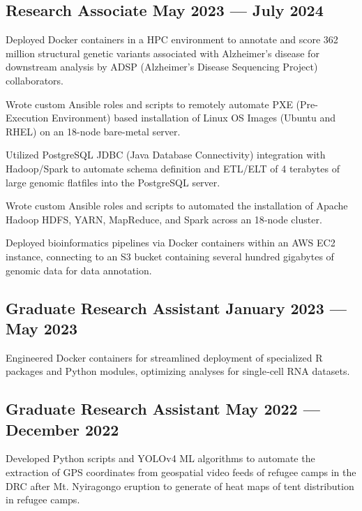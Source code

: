 \subsection{{Research Associate \hfill May 2023 --- July 2024}}
\begin{zitemize}
\item Deployed Docker containers in a HPC environment to annotate and score 362 million structural genetic variants associated with Alzheimer's disease for downstream analysis by ADSP (Alzheimer's Disease Sequencing Project) collaborators.
\item Wrote custom Ansible roles and scripts to remotely automate PXE (Pre-Execution Environment) based installation of Linux OS Images (Ubuntu and RHEL) on an 18-node bare-metal server.
\item  Utilized PostgreSQL JDBC (Java Database Connectivity) integration with Hadoop/Spark to automate schema definition and ETL/ELT of 4 terabytes of large genomic flatfiles  into the PostgreSQL server.
\item Wrote custom Ansible roles and scripts to automated the installation of Apache Hadoop HDFS, YARN, MapReduce, and Spark across an 18‑node cluster.
\item Deployed bioinformatics pipelines via Docker containers within an AWS EC2 instance, connecting to an S3 bucket containing several hundred gigabytes of genomic data for data annotation.
\end{zitemize}

\subsection{{Graduate Research Assistant \hfill January 2023 --- May 2023}}
\begin{zitemize}
\item Engineered Docker containers for streamlined deployment of specialized R packages and Python modules, optimizing analyses for single‑cell RNA datasets.
\end{zitemize}

\subsection{{Graduate Research Assistant \hfill May 2022 --- December 2022}}
\begin{zitemize}
\item Developed Python scripts and YOLOv4 ML algorithms to automate the extraction of GPS coordinates from geospatial video feeds of refugee camps in the DRC after Mt. Nyiragongo eruption to generate of heat maps of tent distribution in refugee camps.
\end{zitemize}

